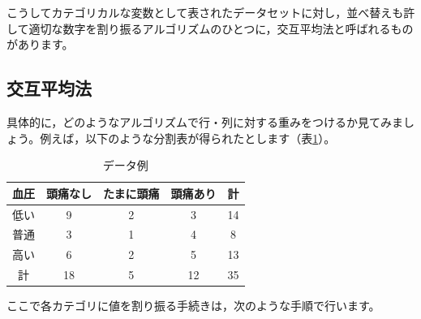 \documentclass{ltjsbook}
\begin{document}
こうしてカテゴリカルな変数として表されたデータセットに対し，並べ替えも許して適切な数字を割り振るアルゴリズムのひとつに，交互平均法と呼ばれるものがあります。

\subsection{交互平均法}
具体的に，どのようなアルゴリズムで行・列に対する重みをつけるか見てみましょう。例えば，以下のような分割表が得られたとします（表\ref{DAexample}）。
\begin{table}[ht]
    \begin{center}
        \caption{データ例}
        \begin{tabular}{c|ccc|c}
            血圧 & 頭痛なし & たまに頭痛 & 頭痛あり & 計  \\
            \hline
            低い & 9    & 2     & 3    & 14 \\
            普通 & 3    & 1     & 4    & 8  \\
            高い & 6    & 2     & 5    & 13 \\
            \hline
            計  & 18   & 5     & 12   & 35 \\
        \end{tabular}
        \label{DAexample}
    \end{center}
\end{table}
ここで各カテゴリに値を割り振る手続きは，次のような手順で行います。
\end{document}
